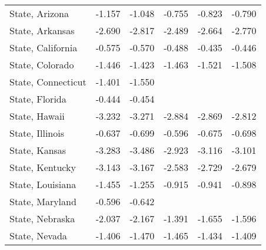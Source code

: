 {\begin{center}
{\begin{longtable}{l*{5}{c}}
\addlinespace
State, Arizona           &      -1.157\sym{**} &      -1.048\sym{**} &      -0.755         &      -0.823\sym{*}  &      -0.790         \\
\addlinespace
State, Arkansas          &      -2.690\sym{***}&      -2.817\sym{***}&      -2.489\sym{***}&      -2.664\sym{***}&      -2.770\sym{***}\\
\addlinespace
State, California        &      -0.575\sym{*}  &      -0.570\sym{**} &      -0.488\sym{*}  &      -0.435         &      -0.446         \\
\addlinespace
State, Colorado          &      -1.446\sym{**} &      -1.423\sym{**} &      -1.463\sym{**} &      -1.521\sym{***}&      -1.508\sym{***}\\
\addlinespace
State, Connecticut       &      -1.401         &      -1.550         &                     &                     &                     \\
\addlinespace
State, Florida           &      -0.444         &      -0.454         &                     &                     &                     \\
\addlinespace
State, Hawaii            &      -3.232\sym{***}&      -3.271\sym{***}&      -2.884\sym{***}&      -2.869\sym{***}&      -2.812\sym{***}\\
\addlinespace
State, Illinois          &      -0.637         &      -0.699\sym{*}  &      -0.596         &      -0.675\sym{*}  &      -0.698\sym{*}  \\
\addlinespace
State, Kansas            &      -3.283\sym{**} &      -3.486\sym{**} &      -2.923\sym{*}  &      -3.116\sym{**} &      -3.101\sym{*}  \\
\addlinespace
State, Kentucky          &      -3.143\sym{***}&      -3.167\sym{***}&      -2.583\sym{***}&      -2.729\sym{***}&      -2.679\sym{***}\\
\addlinespace
State, Louisiana         &      -1.455\sym{*}  &      -1.255\sym{*}  &      -0.915         &      -0.941         &      -0.898         \\
\addlinespace
State, Maryland          &      -0.596         &      -0.642         &                     &                     &                     \\
\addlinespace
State, Nebraska          &      -2.037\sym{*}  &      -2.167\sym{*}  &      -1.391         &      -1.655         &      -1.596         \\
\addlinespace
State, Nevada            &      -1.406         &      -1.470         &      -1.465         &      -1.434         &      -1.409         \\

\end{longtable}}
\end{center}}

